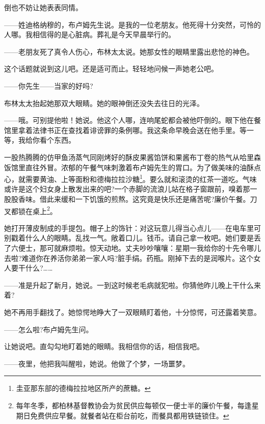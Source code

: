 \par 倒也不妨让她表表同情。
\par ——姓迪格纳穆的，布卢姆先生说。是我的一位老朋友。他死得十分突然，可怜的人哪。我相信得的是心脏病。葬礼是今天早晨举行的。
\par ——老朋友死了真令人伤心，布林太太说。她那女性的眼睛里露出悲怆的神色。
\par 这个话题就说到这儿吧。还是适可而止。轻轻地问候一声她老公吧。
\par ——你先生——当家的好吗?
\par 布林太太抬起她那双大眼睛。她的眼神倒还没失去往日的光泽。
\par ——哦。可别提他啦！她说。他这个人哪，连响尾蛇都会被他吓倒的。眼下他在餐馆里拿着法律书正在查找着诽谤罪的条例哪。我这条命早晚会送在他手里。等一等，我给你看个东西。
\par 一股热腾腾的仿甲鱼汤蒸气同刚烤好的酥皮果酱馅饼和果酱布丁卷的热气从哈里森饭馆里直往外冒。浓郁的午餐气味刺激着布卢姆先生的胃口。为了做美味的油酥点心，就需要黄油、上等面粉和德梅拉拉沙糖\footnote{圭亚那东部的德梅拉拉地区所产的蔗糖。}。要么就和滚烫的红茶一道吃。气味或许是这个妇女身上散发出来的吧?一个赤脚的流浪儿站在格子窗跟前，嗅着那一股股香味。借此来缓和一下饥饿的煎熬。这究竟是快乐还是痛苦呢?廉价午餐。刀叉都锁在桌上\footnote{每年冬季，都柏林基督教协会为贫民供应每顿仅一便士半的廉价午餐，每逢星期日免费供应早餐。就餐者站在柜台前吃，而餐具都用铁链锁住。}。
\par 她打开薄皮制成的手提包。帽子上的饰针：对这玩意儿得当心点儿——在电车里可别戳着什么人的眼睛。乱找一气。敞着口儿。钱币。请自己拿一枚吧。她们要是丢了六便士，那可就麻烦啦。惊天动地。丈夫吵吵嚷嚷：星期一我给你的十先令哪儿去啦?难道你在养活你弟弟一家人吗?脏手绢。药瓶。刚掉下去的是润喉片。这个女人要干什么?……
\par ——准是升起了新月，她说。一到这时候老毛病就犯啦。你猜他昨儿晚上干什么来着?
\par 她不再用手翻找了。她惊愕地睁大了一双眼睛盯着他，十分惊愕，可还露着笑意。
\par ——怎么啦?布卢姆先生问。
\par 让她说吧。直勾勾地盯着她的眼睛。我相信你的话，相信我吧。
\par ——夜里，他把我叫醒啦，她说。他做了个梦，一场噩梦。
